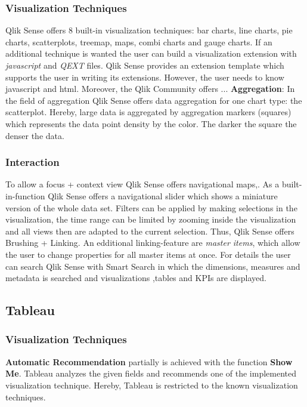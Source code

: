 \subsubsection*{Visualization Techniques}
Qlik Sense offers 8 built-in visualization techniques: bar charts, line charts, pie charts, scatterplots, treemap, maps, combi charts and gauge charts. If an additional technique is wanted the user can build a visualization extension with \textit{javascript} and \textit{QEXT} files\cite{qlikWorkbench}. Qlik Sense provides an extension template which supports the user in writing its extensions. However, the user needs to know javascript and html\cite{qlikVisExtensions}. Moreover, the Qlik Community offers ...
\textbf{Aggregation}: In the field of aggregation Qlik Sense offers data aggregation for one chart type: the scatterplot. Hereby, large data is aggregated by aggregation markers (squares) which represents the data point density by the color. The darker the square the denser the data\cite{qlikScatter}. 

\subsubsection*{Interaction}
To allow a focus + context view Qlik Sense offers navigational maps\cite{beard1990navigational},.
As a built-in-function Qlik Sense offers a navigational slider which shows a miniature version of the whole data set\cite{beard1990navigational}. 
Filters can be applied by making selections in the visualization\cite{qlikSheet}, the time range can be limited by zooming inside the visualization\cite{qlikTime} and all views then are adapted to the current selection. Thus, Qlik Sense offers Brushing + Linking. An edditional linking-feature are \textit{master items}\cite{qlikChangeData}, which allow the user to change properties for all master items at once.
For details the user can search Qlik Sense with Smart Search in which the dimensions, measures and metadata is searched and visualizations ,tables and KPIs are displayed\cite{qlikSmart}.  

\subsection{Tableau}
\subsubsection*{Visualization Techniques}
\textbf{Automatic Recommendation} partially is achieved with the function \textbf{Show Me}\cite{tableauShowme}. Tableau analyzes the given fields and recommends one of the implemented visualization technique. Hereby, Tableau is restricted to the known visualization techniques. 

